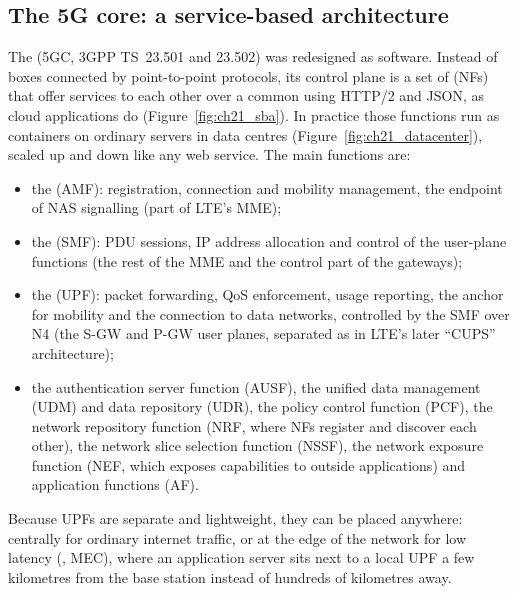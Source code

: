 \subsection{The 5G core: a service-based architecture}
\label{sec:ch21:5gc}

The  (5GC, 3GPP TS~23.501 and 23.502) was redesigned as software. Instead of boxes
connected by point-to-point protocols, its control plane is a set of  (NFs)
that offer services to each other over a common  using HTTP/2 and JSON,
as cloud applications do (Figure~\ref{fig:ch21_sba}). In practice those functions run as containers
on ordinary servers in data centres (Figure~\ref{fig:ch21_datacenter}), scaled up and down like any
web service. The main functions are:
\begin{itemize}

\item the  (AMF): registration, connection and
mobility management, the endpoint of NAS signalling (part of LTE's MME);
\item the  (SMF): PDU sessions, IP address allocation and control
of the user-plane functions (the rest of the MME and the control part of the gateways);
\item the  (UPF): packet forwarding, QoS enforcement, usage reporting, the
anchor for mobility and the connection to data networks, controlled by the SMF over N4 (the S-GW and
P-GW user planes, separated as in LTE's later ``CUPS'' architecture);
\item the authentication server function (AUSF), the unified data management (UDM) and data
repository (UDR), the policy control function (PCF), the network repository function (NRF, where NFs
register and discover each other), the network slice selection function (NSSF), the network exposure
function (NEF, which exposes capabilities to outside applications) and application functions (AF).
\end{itemize}
Because UPFs are separate and lightweight, they can be placed anywhere: centrally for ordinary
internet traffic, or at the edge of the network for low latency (,
MEC), where an application server sits next to a local UPF a few kilometres from the base station
instead of hundreds of kilometres away.

